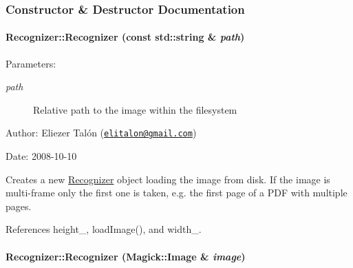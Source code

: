 \subsubsection{Constructor \& Destructor Documentation}
\hypertarget{class_recognizer_50ffc181208bb07ae651aba6249ee7e4}{
\paragraph[Recognizer]{\setlength{\rightskip}{0pt plus 5cm}Recognizer::Recognizer (const std::string \& {\em path})}\hfill}
\label{class_recognizer_50ffc181208bb07ae651aba6249ee7e4}


\begin{Desc}
\item[Parameters:]
\begin{description}
\item[{\em path}]Relative path to the image within the filesystem\end{description}
\end{Desc}
\begin{Desc}
\item[Author:]Eliezer Talón (\href{mailto:elitalon@gmail.com}{\tt elitalon@gmail.com}) \end{Desc}
\begin{Desc}
\item[Date:]2008-10-10\end{Desc}
Creates a new \hyperlink{class_recognizer}{Recognizer} object loading the image from disk. If the image is multi-frame only the first one is taken, e.g. the first page of a PDF with multiple pages. 

References height\_\-, loadImage(), and width\_\-.\hypertarget{class_recognizer_01e0b85a6ad9cfbf6fcab4fe4b294640}{
\paragraph[Recognizer]{\setlength{\rightskip}{0pt plus 5cm}Recognizer::Recognizer (Magick::Image \& {\em image})}\hfill}
\label{class_recognizer_01e0b85a6ad9cfbf6fcab4fe4b294640}


